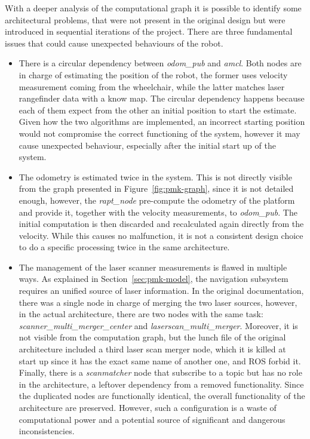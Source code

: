 With a deeper analysis of the computational graph it is possible to identify some architectural problems, that were not present in the original design but were introduced in sequential iterations of the project. There are three fundamental issues that could cause unexpected behaviours of the robot.
\begin{itemize}
\item There is a circular dependency between \textit{odom\_pub} and \textit{amcl}. Both nodes are in charge of estimating the position of the robot, the former uses velocity measurement coming from the wheelchair, while the latter matches laser rangefinder data with a know map. The circular dependency happens because each of them expect from the other an initial position to start the estimate. Given how the two algorithms are implemented, an incorrect starting position would not compromise the correct functioning of the system, however it may cause unexpected behaviour, especially after the initial start up of the system.
\item The odometry is estimated twice in the system. This is not directly visible from the graph presented in Figure~\ref{fig:pmk-graph}, since it is not detailed enough, however, the \textit{rapt\_node} pre-compute the odometry of the platform and provide it, together with the velocity measurements, to \textit{odom\_pub}. The initial computation is then discarded and recalculated again directly from the velocity. While this causes no malfunction, it is not a consistent design choice to do a specific processing twice in the same architecture. 
\item The management of the laser scanner measurements is flawed in multiple ways. As explained in Section~\ref{sec:pmk-model}, the navigation subsystem requires an unified source of laser information. In the original documentation, there was a single node in charge of merging the two laser sources, however, in the actual architecture, there are two nodes with the same task: \textit{scanner\_multi\_merger\_center} and \textit{laserscan\_multi\_merger}. Moreover, it is not visible from the computation graph, but the lunch file of the original architecture included a third laser scan merger node,  which it is killed at start up since it has the exact same name of another one, and ROS forbid it. Finally, there is a \textit{scanmatcher} node that subscribe to a topic but has no role in the architecture, a leftover dependency from a removed functionality. Since the duplicated nodes are functionally identical, the overall functionality of the architecture are preserved. However, such a configuration is a waste of computational power and a potential source of significant and dangerous inconsistencies.
\end{itemize}

